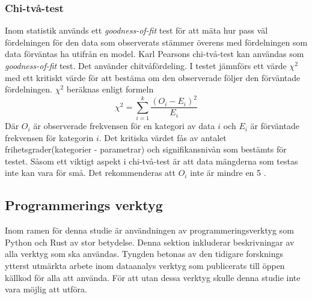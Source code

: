 \documentclass[swedish,a4paper]{article}
\begin{document}
\subsubsection{Chi-två-test}
\label{sec:chi_square}
Inom statistik används ett \textit{goodness-of-fit} test för att mäta
hur pass väl fördelningen för den data som observerats stämmer överens
med fördelningen som data förväntas ha utifrån en model. Karl Pearsons
chi-två-test kan användas som \textit{goodness-of-fit} test. Det
använder chitvåfördeling. I testet jämnförs ett värde $\chi^2$ med ett
kritiskt värde för att bestäma om den observerade följer den förväntade
fördelningen. $\chi^2$ beräknas enligt formeln
$$\chi^2 = \sum_{i=1}^k\frac{(O_i - E_i)^2}{E_i}$$
Där $O_i$ är observerade frekvensen för en kategori av data $i$ och $E_i$
är förväntade frekvensen för kategorin $i$.
Det kritiska värdet fås av antalet frihetsgrader(kategorier - parametrar)
och signifikansnivån som bestämts för testet. Såsom ett viktigt aspekt i chi-två-test är att data mängderna som testas inte kan vara för
små. Det rekommenderas att $O_i$ inte är mindre en 5 \parencite{nist}.



\subsection{Programmerings verktyg}
\label{sec:verktyg}
Inom ramen för denna studie är användningen av programmeringsverktyg som Python
och Rust av stor betydelse. Denna sektion inkluderar beskrivningar av alla
verktyg som ska användas. Tyngden betonas av den tidigare forsknings ytterst
utmärkta arbete inom dataanalys verktyg som publicerats till öppen källkod  för alla att
använda. För att utan dessa verktyg skulle denna studie inte
vara möjlig att utföra. 
\end{document}
